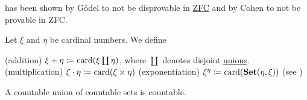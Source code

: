 \medskip

\begin{remark}\label{rem:continuum_hypothesis}
   has been shown by G\"odel to not be disprovable in \hyperref[def:set]{ZFC} and by Cohen to not be provable in ZFC.
\end{remark}

\begin{definition}\label{def:cardinal_arithmetic}
  Let \( \xi \) and \( \eta \) be cardinal numbers. We define
  \begin{thmenum}
    (addition) \( \xi + \eta \coloneqq \operatorname{card}(\xi \coprod \eta) \), where \( \coprod \) denotes disjoint \hyperref[def:disjoint_union]{unions}.
    (multiplication) \( \xi \cdot \eta \coloneqq \operatorname{card}(\xi \times \eta) \)
    (exponentiation) \( \xi^\eta \coloneqq \operatorname{card}(\operatorname{\mathbf{Set}}(\eta, \xi)) \) (see )
  \end{thmenum}
\end{definition}

\begin{proposition}\label{thm:countable_union_of_countable_sets}
  A countable union of countable sets is countable.
\end{proposition}
